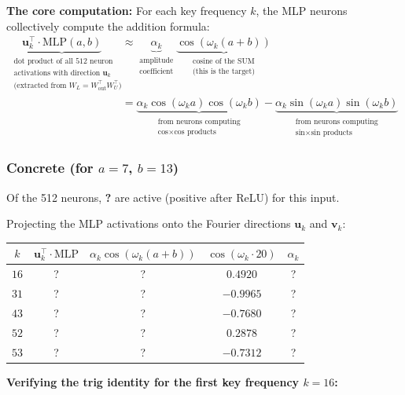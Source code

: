 \documentclass[11pt,a4paper]{article}
\begin{document}
\textbf{The core computation:} For each key frequency $k$, the MLP neurons collectively compute the addition formula:
\begin{align}
    \underbrace{\mathbf{u}_k^\top \cdot \text{MLP}(a,b)}_{\substack{\text{dot product of all } 512 \text{ neuron} \\ \text{activations with direction } \mathbf{u}_k \\ \text{(extracted from } W_L = W_{\text{out}}^\top W_U^\top \text{)}}} &\approx \underbrace{\alpha_k}_{\substack{\text{amplitude} \\ \text{coefficient}}} \underbrace{\cos\!\left(\omega_k(a+b)\right)}_{\substack{\text{cosine of the SUM} \\ \text{(this is the target)}}} \\
    &= \underbrace{\alpha_k \cos(\omega_k a) \cos(\omega_k b)}_{\substack{\text{from neurons computing} \\ \text{cos} \times \text{cos products}}} - \underbrace{\alpha_k \sin(\omega_k a) \sin(\omega_k b)}_{\substack{\text{from neurons computing} \\ \text{sin} \times \text{sin products}}}
\end{align}

\subsubsection*{Concrete (for $a = 7$, $b = 13$)}

Of the 512 neurons, \textbf{?} are active (positive after ReLU) for this input.

Projecting the MLP activations onto the Fourier directions $\mathbf{u}_k$ and $\mathbf{v}_k$:
\begin{center}
\begin{tabular}{|c|c|c|c|c|}
\hline
$k$ & $\mathbf{u}_k^\top \cdot \text{MLP}$ & $\alpha_k \cos(\omega_k(a+b))$ & $\cos(\omega_k \cdot 20)$ & $\alpha_k$ \\ \hline
  $16$ & ? & ? & $0.4920$ & ? \\ \hline
  $31$ & ? & ? & $-0.9965$ & ? \\ \hline
  $43$ & ? & ? & $-0.7680$ & ? \\ \hline
  $52$ & ? & ? & $0.2878$ & ? \\ \hline
  $53$ & ? & ? & $-0.7312$ & ? \\ \hline
\end{tabular}
\end{center}

\textbf{Verifying the trig identity for the first key frequency $k = 16$:}
\end{document}
